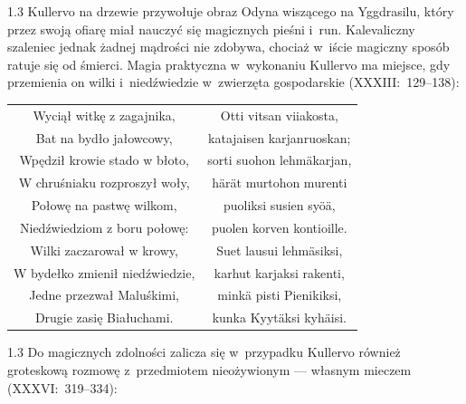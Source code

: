 \documentclass[11pt,a4paper,twoside]{report}
\begin{document}
\begin{spacing}{1.3}
Kullervo na drzewie przywołuje obraz Odyna wiszącego na Yggdrasilu, który przez swoją ofiarę miał nauczyć się magicznych pieśni i~run. Kalevaliczny szaleniec jednak żadnej mądrości nie zdobywa, chociaż w~iście magiczny sposób ratuje się od śmierci.
\newpage
Magia praktyczna w~wykonaniu Kullervo ma miejsce, gdy przemienia on wilki i~niedźwiedzie w~zwierzęta gospodarskie (XXXIII:~129--138):
\end{spacing}
{\centering
\small
\begin{longtable}{c c}
Wyciął witkę z zagajnika, & Otti vitsan viiakosta, \\
Bat na bydło jałowcowy, & katajaisen karjanruoskan; \\
Wpędził krowie stado w błoto, & sorti suohon lehmäkarjan, \\
W chruśniaku rozproszył woły, & härät murtohon murenti \\
Połowę na pastwę wilkom, & puoliksi susien syöä, \\
Niedźwiedziom z boru połowę: & puolen korven kontioille. \\
Wilki zaczarował w krowy, & Suet lausui lehmäsiksi, \\
W bydełko zmienił niedźwiedzie, & karhut karjaksi rakenti, \\
Jedne przezwał Maluśkimi, & minkä pisti Pienikiksi, \\
Drugie zasię Białuchami. & kunka Kyytäksi kyhäisi. \\
\end{longtable}
}
\begin{spacing}{1.3}
Do magicznych zdolności zalicza się w~przypadku Kullervo również groteskową rozmowę z~przedmiotem nieożywionym --- własnym mieczem (XXXVI:~319--334):
\end{spacing}
\end{document}
